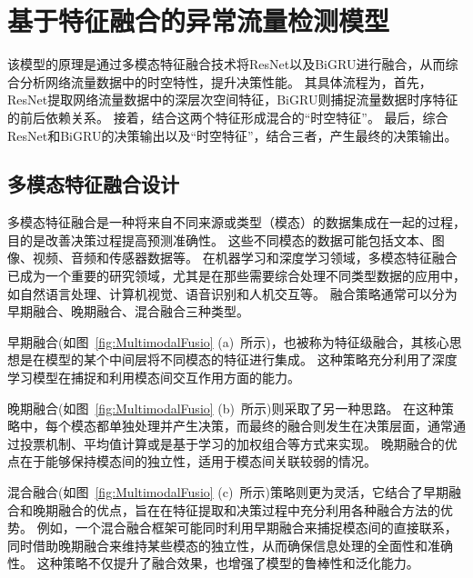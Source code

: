 \section{基于特征融合的异常流量检测模型}
该模型的原理是通过多模态特征融合技术将ResNet以及BiGRU进行融合，从而综合分析网络流量数据中的时空特性，提升决策性能。
其具体流程为，首先，ResNet提取网络流量数据中的深层次空间特征，BiGRU则捕捉流量数据时序特征的前后依赖关系。
接着，结合这两个特征形成混合的“时空特征”。
最后，综合ResNet和BiGRU的决策输出以及“时空特征”，结合三者，产生最终的决策输出。
\subsection{多模态特征融合设计}
多模态特征融合是一种将来自不同来源或类型（模态）的数据集成在一起的过程，目的是改善决策过程提高预测准确性。
这些不同模态的数据可能包括文本、图像、视频、音频和传感器数据等。
在机器学习和深度学习领域，多模态特征融合已成为一个重要的研究领域，尤其是在那些需要综合处理不同类型数据的应用中，如自然语言处理、计算机视觉、语音识别和人机交互等。
融合策略通常可以分为早期融合、晚期融合、混合融合三种类型\cite{hejunandzhangcaiqing}。\par

早期融合(如图~\ref{fig:MultimodalFusio} (a)~所示)，也被称为特征级融合，其核心思想是在模型的某个中间层将不同模态的特征进行集成。
这种策略充分利用了深度学习模型在捕捉和利用模态间交互作用方面的能力。\par

晚期融合(如图~\ref{fig:MultimodalFusio} (b)~所示)则采取了另一种思路。
在这种策略中，每个模态都单独处理并产生决策，而最终的融合则发生在决策层面，通常通过投票机制、平均值计算或是基于学习的加权组合等方式来实现。
晚期融合的优点在于能够保持模态间的独立性，适用于模态间关联较弱的情况。\par

混合融合(如图~\ref{fig:MultimodalFusio} (c)~所示)策略则更为灵活，它结合了早期融合和晚期融合的优点，旨在在特征提取和决策过程中充分利用各种融合方法的优势。
例如，一个混合融合框架可能同时利用早期融合来捕捉模态间的直接联系，同时借助晚期融合来维持某些模态的独立性，从而确保信息处理的全面性和准确性。
这种策略不仅提升了融合效果，也增强了模型的鲁棒性和泛化能力。\par

